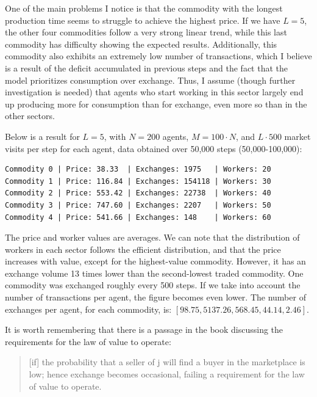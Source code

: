 One of the main problems I notice is that the commodity with the longest production time seems to struggle to achieve the highest price. If we have $L=5$, the other four commodities follow a very strong linear trend, while this last commodity has difficulty showing the expected results. Additionally, this commodity also exhibits an extremely low number of transactions, which I believe is a result of the deficit accumulated in previous steps and the fact that the model prioritizes consumption over exchange. Thus, I assume (though further investigation is needed) that agents who start working in this sector largely end up producing more for consumption than for exchange, even more so than in the other sectors.

Below is a result for $L=5$, with $N=200$ agents, $M=100 \cdot N$, and $L \cdot 500$ market visits per step for each agent, data obtained over 50,000 steps (50,000-100,000):


\begin{verbatim}
Commodity 0 | Price: 38.33  | Exchanges: 1975   | Workers: 20 
Commodity 1 | Price: 116.84 | Exchanges: 154118 | Workers: 30 
Commodity 2 | Price: 553.42 | Exchanges: 22738  | Workers: 40 
Commodity 3 | Price: 747.60 | Exchanges: 2207   | Workers: 50 
Commodity 4 | Price: 541.66 | Exchanges: 148    | Workers: 60 
\end{verbatim}



The price and worker values are averages. We can note that the distribution of workers in each sector follows the efficient distribution, and that the price increases with value, except for the highest-value commodity. However, it has an exchange volume 13 times lower than the second-lowest traded commodity. One commodity was exchanged roughly every 500 steps.  If we take into account the number of transactions per agent, the figure becomes even lower. The number of exchanges per agent, for each commodity, is: $[98.75, 5137.26, 568.45, 44.14, 2.46]$.

It is worth remembering that there is a passage in the book discussing the requirements for the law of value to operate:

\begin{quote}
[if] the probability that a seller of j will find a buyer in the marketplace is low; hence exchange becomes occasional, failing a requirement for the law of value to operate.

\end{quote}

